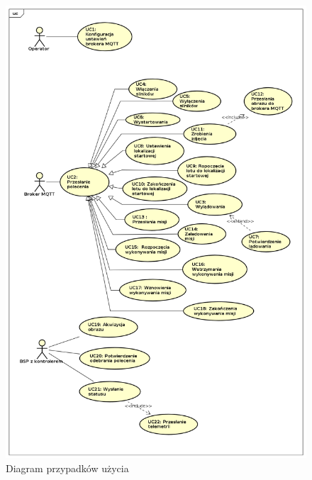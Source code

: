 \newpage


\begin{center}
  \begin{figure}[!ht]
    \includegraphics[width=14cm]{./Obrazy/UseCaseDiagram0.png}
    \caption{Diagram przypadków użycia}
    \end{figure}
  \end{center}

